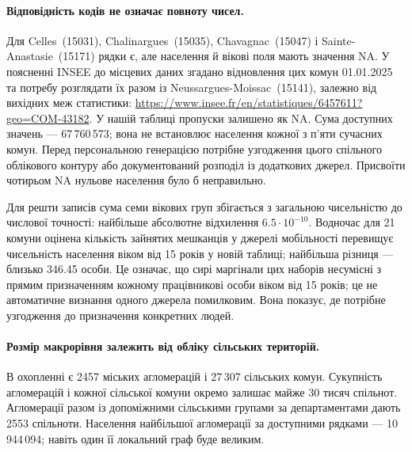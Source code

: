 \documentclass[11pt,a4paper]{article}
\begin{document}
\paragraph{Відповідність кодів не означає повноту чисел.} Для Celles~(15031), Chalinargues~(15035), Chavagnac~(15047) і Sainte-Anastasie~(15171) рядки є, але населення й вікові поля мають значення NA. У поясненні INSEE до місцевих даних згадано відновлення цих комун 01.01.2025 та потребу розглядати їх разом із Neussargues-Moissac~(15141), залежно від вихідних меж статистики: \url{https://www.insee.fr/en/statistiques/6457611?geo=COM-43182}. У нашій таблиці пропуски залишено як NA. Сума доступних значень --- 67\,760\,573; вона не встановлює населення кожної з п'яти сучасних комун. Перед персональною генерацією потрібне узгодження цього спільного облікового контуру або документований розподіл із додаткових джерел. Присвоїти чотирьом NA нульове населення було б неправильно.

Для решти записів сума семи вікових груп збігається з загальною чисельністю до числової точності: найбільше абсолютне відхилення $6.5\cdot10^{-10}$. Водночас для 21 комуни оцінена кількість зайнятих мешканців у джерелі мобільності перевищує чисельність населення віком від 15 років у новій таблиці; найбільша різниця --- близько 346.45 особи. Це означає, що сирі маргінали цих наборів несумісні з прямим призначенням кожному працівникові особи віком від 15 років; це не автоматичне визнання одного джерела помилковим. Вона показує, де потрібне узгодження до призначення конкретних людей.

\paragraph{Розмір макрорівня залежить від обліку сільських територій.} В охопленні є 2457 міських агломерацій і 27\,307 сільських комун. Сукупність агломерацій і кожної сільської комуни окремо залишає майже 30 тисяч спільнот. Агломерації разом із допоміжними сільськими групами за департаментами дають 2553 спільноти. Населення найбільшої агломерації за доступними рядками --- 10\,944\,094; навіть один її локальний граф буде великим.

\begin{table}[htbp]
\centering\small

\caption{Три поділи того самого охоплення. Внутрішні поїздки --- частка оцінених працівників у домашній та робочій спільноті, що збігаються; включено роботу у своїй комуні. Остання колонка --- лише нижня оцінка пам'яті п'яти щільних масивів $M\times M$ типу float64. Це не вимірювання часу, пікової пам'яті чи точності SMPT.}
\end{table}
\end{document}
